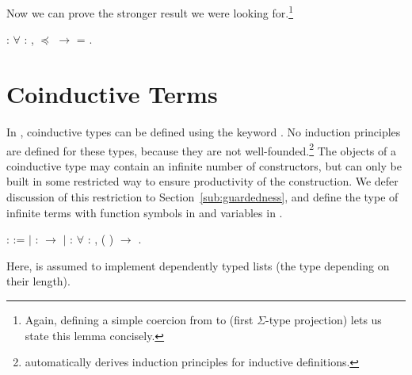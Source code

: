 Now we can prove the stronger result we were looking
for.\footnote{Again, defining a simple coercion from
   to
   (first $\Sigma$-type
  projection) lets us state this lemma concisely.}
\begin{singlespace}
\begin{coqdoccode}
\coqdocnoindent
{}
:
\ensuremath{\forall} \coqdocvar{\ensuremath{\alpha}} :
,
\coqdocvariable{\ensuremath{\alpha}} \ensuremath{\preceq}
\ensuremath{\rightarrow}
\coqdocvariable{\ensuremath{\alpha}} =
.\coqdoceol
\end{coqdoccode}
\end{singlespace}


\section{Coinductive Terms}\label{sec:terms}

In \Coq, coinductive types can be defined using the
 keyword \citep{gimenez-casteran-07}. No
induction principles are defined for these types, because they are not
well-founded.\footnote{\Coq automatically derives induction principles
  for inductive definitions.}
The objects of a coinductive type may contain an infinite number of
constructors, but can only be built in some restricted way to ensure
productivity of the construction.
We defer discussion of this restriction to
Section~\ref{sub:guardedness}, and define the type
 of infinite terms with
function symbols in  and variables in .
\begin{singlespace}
\begin{coqdoccode}
\coqdocnoindent
{}  :
 :=\coqdoceol
\coqdocindent{1.00em}
\ensuremath{|}  : 
\ensuremath{\rightarrow} \coqdoceol
\coqdocindent{1.00em}
\ensuremath{|}  :
\ensuremath{\forall}  : ,
( )
\ensuremath{\rightarrow} .\coqdoceol
\end{coqdoccode}
\end{singlespace}
Here,  is assumed to
implement dependently typed lists (the type depending on their length).

